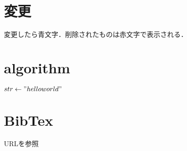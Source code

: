 \section{変更}
変更したら青文字．削除されたものは赤文字で表示される．

\section{algorithm}
\begin{algorithmic}
    \State $str \gets "hello world"$
    \EndFor
    \EndFunction
\end{algorithmic}

\section{BibTex}
URL\cite{sagaweb}を参照